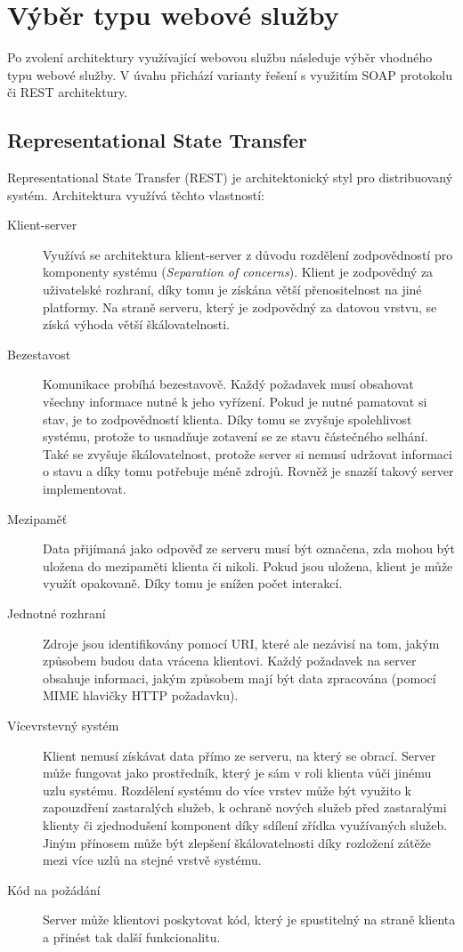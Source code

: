 \documentclass{diplomka}
\begin{document}
\newpage
\section{Výběr typu webové služby}
Po zvolení architektury využívající webovou službu následuje výběr vhodného typu webové služby. V úvahu přichází varianty řešení s využitím SOAP protokolu či REST architektury.
\subsection{Representational State Transfer}
Representational State Transfer\cite{rest} (REST) je architektonický styl pro distribuovaný systém. Architektura využívá těchto vlastností:
\begin{description}
\item [Klient-server] Využívá se architektura klient-server z důvodu rozdělení zodpovědností pro komponenty systému (\emph{Separation of concerns}). Klient je zodpovědný za uživatelské rozhraní, díky tomu je získána větší přenositelnost na jiné platformy. Na straně serveru, který je zodpovědný za datovou vrstvu, se získá výhoda větší škálovatelnosti. 
\item [Bezestavost] Komunikace probíhá bezestavově. Každý požadavek musí obsahovat všechny informace nutné k jeho vyřízení. Pokud je nutné pamatovat si stav, je to zodpovědností klienta. Díky tomu se zvyšuje spolehlivost systému, protože to usnadňuje zotavení se ze stavu částečného selhání. Také se zvyšuje škálovatelnost, protože server si nemusí udržovat informaci o stavu a díky tomu potřebuje méně zdrojů. Rovněž je snazší takový server implementovat.
\item [Mezipaměť] Data přijímaná jako odpověď ze serveru musí být označena, zda mohou být uložena do mezipaměti klienta či nikoli. Pokud jsou uložena, klient je může využít opakovaně. Díky tomu je snížen počet interakcí. 
\item [Jednotné rozhraní] Zdroje jsou identifikovány pomocí URI, které ale nezávisí na tom, jakým způsobem budou data vrácena klientovi. Každý požadavek na server obsahuje informaci, jakým způsobem mají být data zpracována (pomocí MIME hlavičky HTTP požadavku).  
\item [Vícevrstevný systém] Klient nemusí získávat data přímo ze serveru, na který se obrací. Server může fungovat jako prostředník, který je sám v roli klienta vůči jinému uzlu systému. Rozdělení systému do více vrstev může být využito k zapouzdření zastaralých služeb, k ochraně nových služeb před zastaralými klienty či zjednodušení komponent díky sdílení zřídka využívaných služeb. Jiným přínosem může být zlepšení škálovatelnosti díky rozložení zátěže mezi více uzlů na stejné vrstvě systému.
\item [Kód na požádání] Server může klientovi poskytovat kód, který je spustitelný na straně klienta a přinést tak další funkcionalitu.
\end{description}
\end{document}
